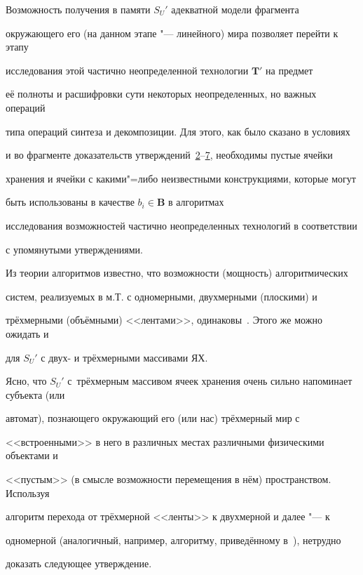 \smallskip



Возможность получения в памяти $S_{U}'$ адекватной модели фрагмента

окружающего его (на данном этапе "--- линейного) мира позволяет перейти к этапу

исследования этой частично неопределенной технологии $\mathbf{T}'$ на предмет

её полноты и расшифровки сути некоторых неопределенных, но важных операций

типа операций синтеза и декомпозиции. Для этого, как было сказано в условиях

и во фрагменте доказательств утверждений~\hyperlink{kr:utv2}{2}--\hyperlink{kr:utv7}{7}, необходимы пустые ячейки

хранения и ячейки с какими"=либо неизвестными конструкциями, которые могут

быть использованы в качестве $b_{i}\in \mathbf{B}$ в алгоритмах

исследования возможностей частично неопределенных технологий в соответствии

с упомянутыми утверждениями.



Из теории алгоритмов известно, что возможности (мощность) алгоритмических

систем, реализуемых в м.Т. с одномерными, двухмерными (плоскими) и

трёхмерными (объёмными) <<лентами>>, одинаковы~\cite{krylov:bib22}. Этого же можно ожидать и

для $S_{U}'$ с двух- и трёхмерными массивами ЯХ. 

Ясно, что $S_{U}'$ с~трёхмерным массивом ячеек хранения очень сильно напоминает субъекта (или

автомат), познающего окружающий его (или нас) трёхмерный мир с

<<встроенными>> в него в различных местах различными физическими объектами и

<<пустым>> (в смысле возможности перемещения в нём) пространством. Используя

алгоритм перехода от трёхмерной <<ленты>> к двухмерной и далее "--- к

одномерной (аналогичный, например, алгоритму, приведённому в~\cite{krylov:bib22}), нетрудно

доказать следующее утверждение.



\smallskip



